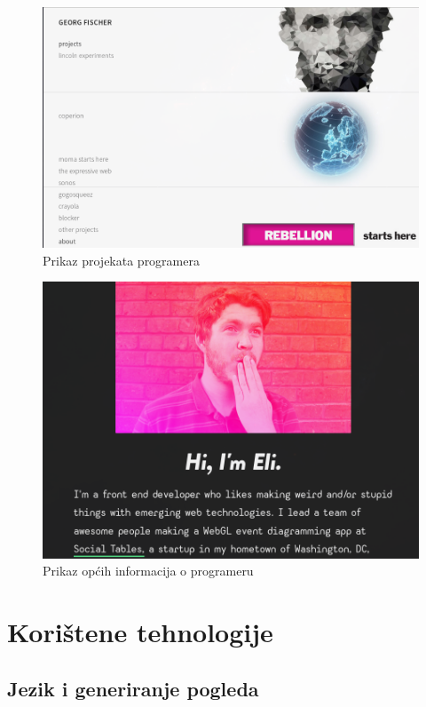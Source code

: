 \documentclass[times, utf8, zavrsni, numeric]{fer}
\begin{document}
\begin{figure}[htb]
				\includegraphics[width=14.6cm]{images/fishnation.png}
				\caption{Prikaz projekata programera}
				\label{fig:fishnation}
\end{figure}

\begin{figure}[htb]
				\includegraphics[width=14.6cm]{images/eli.png}
				\caption{Prikaz općih informacija o programeru}
				\label{fig:eli}
\end{figure}

\chapter{Korištene tehnologije}
\section{Jezik i generiranje pogleda}
\end{document}
